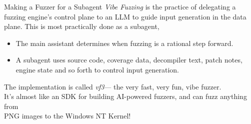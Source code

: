 \begin{frame}{Making a Fuzzer for a Subagent}
    \textit{Vibe Fuzzing} is the practice of delegating a fuzzing engine's control plane to an LLM
    to guide input generation in the data plane. This is most practically done as a subagent,
    \begin{itemize}
        \item The main assistant determines when fuzzing is a rational step forward.
        \item A subagent uses source code, coverage data, decompiler text, patch notes, engine
            state and so forth to control input generation.
    \end{itemize}
    \vspace{0.5cm}
    \begin{center}
        The implementation is called \textit{vf3}--- the very fast, very fun, vibe fuzzer. \\
        It's almost like an SDK for building AI-powered fuzzers, and can fuzz anything from \\
        PNG images to the Windows NT Kernel!
    \end{center}
    \vspace{-0.5cm}
\end{frame}
